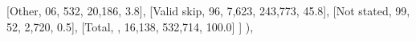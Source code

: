 \documentclass[
  11pt,
  a4paper,
]{article}
\newenvironment{Shaded}{\begin{snugshade}}{\end{snugshade}}
\newcommand{\NormalTok}[1]{\textcolor[rgb]{0.00,0.23,0.31}{#1}}
\newcommand{\StringTok}[1]{\textcolor[rgb]{0.13,0.47,0.30}{#1}}
\begin{document}
\begin{Shaded}
\begin{Highlighting}[]
\NormalTok{                    [}\StringTok{\textquotesingle{}Other\textquotesingle{}}\NormalTok{, }\StringTok{\textquotesingle{}06\textquotesingle{}}\NormalTok{, }\StringTok{\textquotesingle{}532\textquotesingle{}}\NormalTok{, }\StringTok{\textquotesingle{}20,186\textquotesingle{}}\NormalTok{, }\StringTok{\textquotesingle{}3.8\textquotesingle{}}\NormalTok{],}
\NormalTok{                    [}\StringTok{\textquotesingle{}Valid skip\textquotesingle{}}\NormalTok{, }\StringTok{\textquotesingle{}96\textquotesingle{}}\NormalTok{, }\StringTok{\textquotesingle{}7,623\textquotesingle{}}\NormalTok{, }\StringTok{\textquotesingle{}243,773\textquotesingle{}}\NormalTok{, }\StringTok{\textquotesingle{}45.8\textquotesingle{}}\NormalTok{],}
\NormalTok{                    [}\StringTok{\textquotesingle{}Not stated\textquotesingle{}}\NormalTok{, }\StringTok{\textquotesingle{}99\textquotesingle{}}\NormalTok{, }\StringTok{\textquotesingle{}52\textquotesingle{}}\NormalTok{, }\StringTok{\textquotesingle{}2,720\textquotesingle{}}\NormalTok{, }\StringTok{\textquotesingle{}0.5\textquotesingle{}}\NormalTok{],}
\NormalTok{                    [}\StringTok{\textquotesingle{}Total\textquotesingle{}}\NormalTok{, }\StringTok{\textquotesingle{}\textquotesingle{}}\NormalTok{, }\StringTok{\textquotesingle{}16,138\textquotesingle{}}\NormalTok{, }\StringTok{\textquotesingle{}532,714\textquotesingle{}}\NormalTok{, }\StringTok{\textquotesingle{}100.0\textquotesingle{}}\NormalTok{]}
\NormalTok{                ]}
\NormalTok{            ),}


\end{Highlighting}
\end{Shaded}
\end{document}
